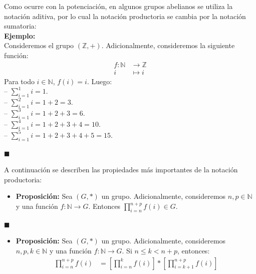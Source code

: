 \documentclass[10 pt]{article}
\begin{document}
\Large{Como ocurre con la potenciación, en algunos grupos abelianos se utiliza la notación aditiva, por lo cual la notación productoria se cambia por la notación sumatoria:} \\

\Large{\textbf{Ejemplo:}} \\

\Large{Consideremos el grupo $(\mathbb Z,+)$. Adicionalmente, consideremos la siguiente función:}
\begin{align*}
    f: \mathbb N& \rightarrow \mathbb Z \\
    i & \mapsto i 
\end{align*}
\Large{Para todo $i \in \mathbb N$, $f(i)=i$. Luego: \\

-- $\sum_{i=1}^{1}i=1$.  \\

-- $\sum_{i=1}^{2}i=1+2=3$. \\

-- $\sum_{i=1}^{3}i=1+2+3=6$.  \\

-- $\sum_{i=1}^{4}i=1+2+3+4=10$.  \\

-- $\sum_{i=1}^{5}i=1+2+3+4+5=15$.}\\

\begin{flushright}
    $\blacksquare$
\end{flushright}

\Large{A continuación se describen las propiedades más importantes de la notación productoria:} \\

\begin{itemize}
    \item \Large{\textbf{Proposición:} Sea $(G,*)$ un grupo. Adicionalmente, consideremos $n,p \in \mathbb N$ y una función $f:\mathbb N \rightarrow G$. Entonces $\prod_{i=n}^{n+p}f(i) \in G$.} \\
\end{itemize}

\begin{flushright}
    $\blacksquare$
\end{flushright}

\begin{itemize}
    \item \Large{\textbf{Proposición:} Sea $(G,*)$ un grupo. Adicionalmente, consideremos $n,p,k \in \mathbb N$ y una función $f:\mathbb N \rightarrow G$. Si $n \leq k<n+p$, entonces:}
    \begin{align*}
        \prod_{i=n}^{{n+p}}f(i)&=\left[\prod_{i=n}^{k}f(i) \right]* \left[\prod_{i=k+1}^{n+p}f(i) \right]
    \end{align*}
\end{itemize}
\end{document}
